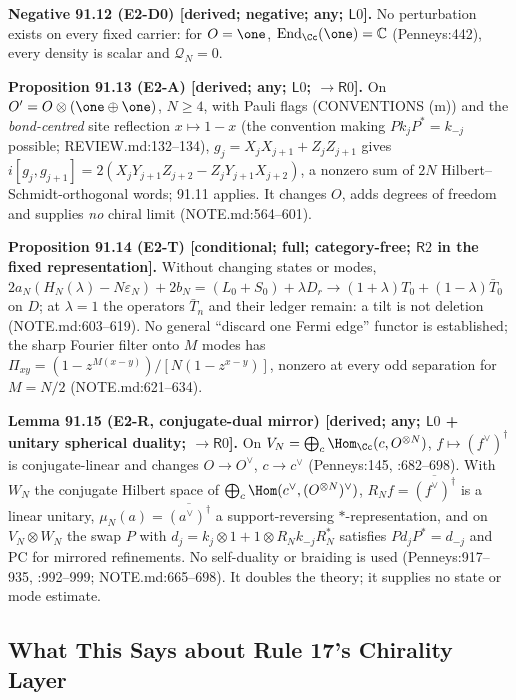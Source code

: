 \textbf{Negative 91.12 (E2-D0) [derived; negative; any; \(\mathsf L0\)].}  No perturbation exists on every fixed
carrier: for \(O=\one\), \(\operatorname{End}_\Cc(\one)=\mathbb C\) (Penneys:442), every density is scalar and \(\mathcal Q_N=0\).

\textbf{Proposition 91.13 (E2-A) [derived; any; \(\mathsf L0\); \(\to\mathsf R0\)].}  On \(O'=O\otimes(\one\oplus\one)\),
\(N\ge4\), with Pauli flags (CONVENTIONS (m)) and the \emph{bond-centred} site reflection \(x\mapsto1-x\) (the convention
making \(P k_jP^*=k_{-j}\) possible; REVIEW.md:132--134), \(g_j=X_jX_{j+1}+Z_jZ_{j+1}\) gives
\(i[g_j,g_{j+1}]=2(X_jY_{j+1}Z_{j+2}-Z_jY_{j+1}X_{j+2})\), a nonzero sum of \(2N\) Hilbert--Schmidt-orthogonal words;
91.11 applies.  It changes \(O\), adds degrees of freedom and supplies \emph{no} chiral limit (NOTE.md:564--601).

\textbf{Proposition 91.14 (E2-T) [conditional; full; category-free; \(\mathsf R2\) in the fixed representation].}
Without changing states or modes, \(2a_N(H_N(\lambda)-N\varepsilon_N)+2b_N=(L_0+S_0)+\lambda D_r\to(1+\lambda)T_0+
(1-\lambda)\bar T_0\) on \(D\); at \(\lambda=1\) the operators \(\bar T_n\) and their ledger remain: a tilt is not deletion
(NOTE.md:603--619).  No general ``discard one Fermi edge'' functor is established; the sharp Fourier filter onto
\(M\) modes has \(\Pi_{xy}=(1-z^{M(x-y)})/[N(1-z^{x-y})]\), nonzero at every odd separation for \(M=N/2\) (NOTE.md:621--634).

\textbf{Lemma 91.15 (E2-R, conjugate-dual mirror) [derived; any; \(\mathsf L0\) + unitary spherical duality; \(\to\mathsf R0\)].}
On \(V_N=\bigoplus_c\Hom_\Cc(c,O^{\otimes N})\), \(f\mapsto(f^\vee)^\dagger\) is conjugate-linear and changes \(O\to O^\vee\),
\(c\to c^\vee\) (Penneys:145, :682--698).  With \(W_N\) the conjugate Hilbert space of \(\bigoplus_c\Hom(c^\vee,
(O^{\otimes N})^\vee)\), \(R_Nf=\overline{(f^\vee)^\dagger}\) is a linear unitary, \(\mu_N(a)=\overline{(a^\vee)^\dagger}\) a
support-reversing \(*\)-representation, and on \(V_N\otimes W_N\) the swap \(P\) with \(d_j=k_j\otimes1+1\otimes R_Nk_{-j}R_N^*\)
satisfies \(Pd_jP^*=d_{-j}\) and PC for mirrored refinements.  No self-duality or braiding is used
(Penneys:917--935, :992--999; NOTE.md:665--698).  It doubles the theory; it supplies no state or mode estimate.

\subsection{What This Says about Rule 17's Chirality Layer}

